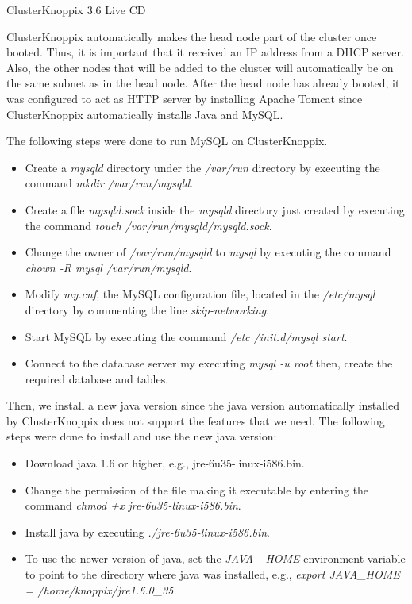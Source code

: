 \documentclass[preprint]{acm_proc_article-sp}
\begin{document}
ClusterKnoppix 3.6 Live CD

ClusterKnoppix automatically makes the head node part of the cluster once booted. Thus, it is important that it received an IP address from a DHCP server. Also, the other nodes that will be added to the cluster will automatically be on the same subnet as in the head node. After the head node has already booted, it was configured to act as HTTP server by installing Apache Tomcat since ClusterKnoppix automatically installs Java and MySQL.

The following steps were done to run MySQL on ClusterKnoppix.
\begin{itemize}
	\item Create a \emph{mysqld} directory under the \emph{/var/run} directory by executing the command \emph{mkdir /var/run/mysqld}.
	\item Create a file \emph{mysqld.sock} inside the \emph{mysqld} directory just created by executing the command \emph{touch /var/run/mysqld/mysqld.sock}.
	\item Change the owner of \emph{/var/run/mysqld} to \emph{mysql} by executing the command \emph{chown -R mysql /var/run/mysqld}.
	\item Modify \emph{my.cnf}, the MySQL configuration file, located in the \emph{/etc/mysql} directory by commenting the line \emph{skip-networking}.
	\item Start MySQL by executing the command \emph{/etc /init.d/mysql start}.
	\item Connect to the database server my executing \emph{mysql -u root} then, create the required database and tables.
\end{itemize}

Then, we install a new java version since the java version automatically installed by ClusterKnoppix does not support the features that we need.  The following steps were done to install and use the new java version:
\begin{itemize}
	\item Download java 1.6 or higher, e.g., jre-6u35-linux-i586.bin.
	\item Change the permission of the file making it executable by entering the command \emph{chmod +x jre-6u35-linux-i586.bin}.
	\item Install java by executing \emph{./jre-6u35-linux-i586.bin}.
	\item To use the newer version of java, set the \emph{JAVA\_ HOME} environment variable to point to the directory where java was installed, e.g., \emph{export JAVA\_HOME = /home/knoppix/jre1.6.0\_35}.
\end{itemize}
\end{document}
